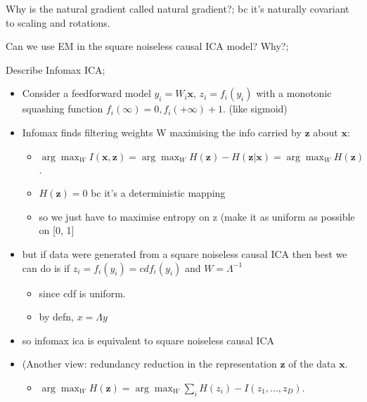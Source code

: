 \documentclass{article}
\begin{document}
Why is the natural gradient called natural gradient?; bc it's naturally covariant to scaling and rotations.


Can we use EM in the square noiseless causal ICA model? Why?; 

Describe Infomax ICA; \begin{itemize}
    \item Consider a feedforward model $y_i=W_i\mathbf{x}$, $z_i=f_i(y_i)$
    with a monotonic squashing function $f_i(\infty)=0, f_i(+\infty)+1$. (like sigmoid)
    \item Infomax finds filtering weights W maximising the info carried by $\mathbf{z}$ about $\mathbf{x}$: \begin{itemize}
        \item $\arg\max_W I(\mathbf{x, z}) = \arg\max_W H(\mathbf{z})-H(\mathbf{z|x})=\arg\max_WH(\mathbf{z})$.
        \item $H(\mathbf{z})=0$ bc it's a deterministic mapping
        \item so we just have to maximise entropy on z (make it as uniform as possible on [0, 1]
    \end{itemize}
    \item but if data were generated from a square noiseless causal ICA then best we can do is if $z_i=f_i(y_i)=cdf_i(y_i)$ and $W=\Lambda^{-1}$
    \begin{itemize}
        \item since cdf is uniform.
        \item by defn, $x=\Lambda y$
    \end{itemize}
    \item so infomax ica is equivalent to square noiseless causal ICA
    \item (Another view: redundancy reduction in the representation $\mathbf{z}$ of the data $\mathbf{x}$.
    \begin{itemize}
        \item $\arg\max_W H(\mathbf{z})=\arg\max_W\sum_i H(z_i)-I(z_1,...,z_D)$.
    \end{itemize}
\end{itemize}
\end{document}
